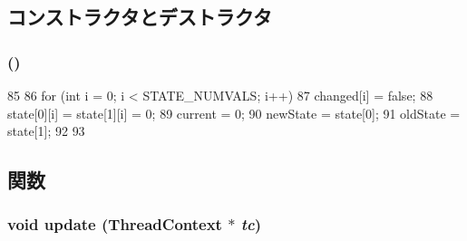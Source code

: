 \subsection{コンストラクタとデストラクタ}
\hypertarget{structTrace_1_1ArmNativeTrace_1_1ThreadState_ae7173394d697db6556eb202777688063}{
\subsubsection[{ThreadState}]{ ()}}
\label{structTrace_1_1ArmNativeTrace_1_1ThreadState_ae7173394d697db6556eb202777688063}



\begin{DoxyCode}
85         {
86             for (int i = 0; i < STATE_NUMVALS; i++) {
87                 changed[i] = false;
88                 state[0][i] = state[1][i] = 0;
89                 current = 0;
90                 newState = state[0];
91                 oldState = state[1];
92             }
93         }
\end{DoxyCode}


\subsection{関数}
\hypertarget{structTrace_1_1ArmNativeTrace_1_1ThreadState_ace3d3d91c61ce60aa033e666444d2301}{
\subsubsection[{update}]{\setlength{\rightskip}{0pt plus 5cm}void update ({\bf ThreadContext} $\ast$ {\em tc})}}
\label{structTrace_1_1ArmNativeTrace_1_1ThreadState_ace3d3d91c61ce60aa033e666444d2301}



